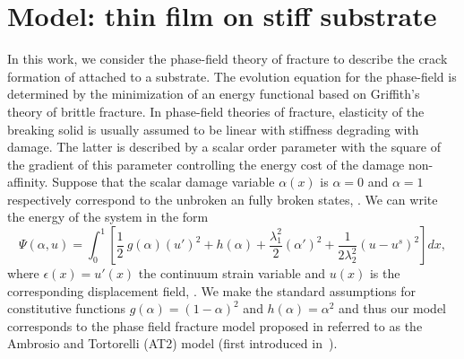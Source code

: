 \section{Model: thin film on stiff substrate}
\label{sec:rigid}

In this work, we consider the phase-field theory of fracture to describe the crack formation of  attached to a substrate. The evolution equation for the phase-field is determined by the minimization of an energy functional based on Griffith's theory of brittle fracture.
In phase-field theories of fracture, elasticity of the breaking solid is usually assumed to be linear with stiffness degrading with damage. The latter is described by a scalar order parameter with the square of the gradient of this parameter controlling the energy cost of the damage non-affinity.
Suppose that the scalar damage variable $\alpha(x)$ is  $\alpha=0$ and $\alpha=1$ respectively correspond to the unbroken an fully broken states, . We can write the energy of the system in the  form
\begin{equation}
\label{modeld}
\Psi(\alpha, u) = \int_{0}^{1} \left[ \frac{1}{2} \ g(\alpha)(u')^2 + h(\alpha) + \frac{\lambda_1^2}{2}(\alpha')^2 
+ \frac{1}{2 \lambda_2^2} (u-u^s)^2 \right] dx,
\end{equation}
where $\epsilon(x)=u'(x)$ the continuum strain variable and $u(x)$ is the corresponding displacement field, . 
We make the standard assumptions for constitutive functions  $g(\alpha) =(1-\alpha)^2$ and $h(\alpha) =\alpha^2$ and thus our model corresponds to the  phase field fracture model proposed  in  \cite{Bourdin2000-pc,Miehe2010-sj,Miehe2010-ja} referred to as the Ambrosio and Tortorelli (AT2) model (first introduced in~\cite{at}). 
